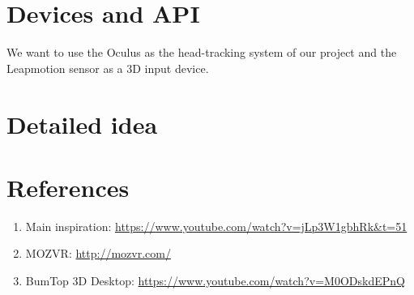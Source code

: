 \documentclass[paper=a4, fontsize=11pt]{scrartcl} %
\numberwithin{equation}{section} %
\numberwithin{figure}{section} %
\numberwithin{table}{section} %
\begin{document}

\section{Devices and API}
We want to use the Oculus as the head-tracking system of our project and the Leapmotion sensor as a 3D input device. 


\section{Detailed idea}



\section{References}
\label{sec:refs}
\begin{enumerate}
\item Main inspiration: \url{https://www.youtube.com/watch?v=jLp3W1gbhRk&t=51}
\item MOZVR: \url{http://mozvr.com/}
\item BumTop 3D Desktop: \url{https://www.youtube.com/watch?v=M0ODskdEPnQ}
\end{enumerate}


\end{document}
